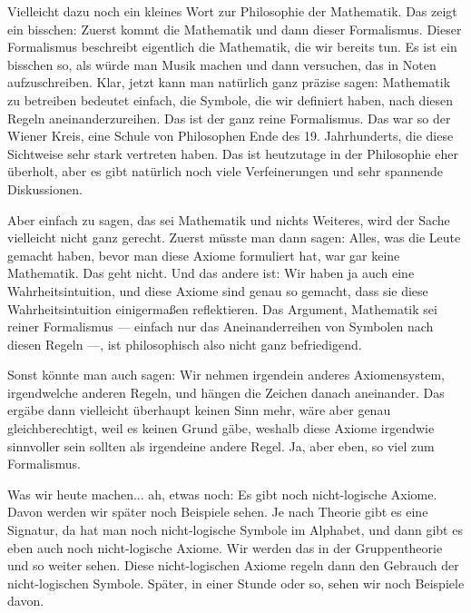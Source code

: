 \begin{spoken-clean}[00:08:40 - 00:10:17]
Vielleicht dazu noch ein kleines Wort zur Philosophie der Mathematik. Das zeigt ein bisschen: Zuerst kommt die Mathematik und dann dieser Formalismus. Dieser Formalismus beschreibt eigentlich die Mathematik, die wir bereits tun. Es ist ein bisschen so, als würde man Musik machen und dann versuchen, das in Noten aufzuschreiben. Klar, jetzt kann man natürlich ganz präzise sagen: Mathematik zu betreiben bedeutet einfach, die Symbole, die wir definiert haben, nach diesen Regeln aneinanderzureihen. Das ist der ganz reine Formalismus. Das war so der Wiener Kreis, eine Schule von Philosophen Ende des 19. Jahrhunderts, die diese Sichtweise sehr stark vertreten haben. Das ist heutzutage in der Philosophie eher überholt, aber es gibt natürlich noch viele Verfeinerungen und sehr spannende Diskussionen.

Aber einfach zu sagen, das sei Mathematik und nichts Weiteres, wird der Sache vielleicht nicht ganz gerecht. Zuerst müsste man dann sagen: Alles, was die Leute gemacht haben, bevor man diese Axiome formuliert hat, war gar keine Mathematik. Das geht nicht. Und das andere ist: Wir haben ja auch eine Wahrheitsintuition, und diese Axiome sind genau so gemacht, dass sie diese Wahrheitsintuition einigermaßen reflektieren. Das Argument, Mathematik sei reiner Formalismus --- einfach nur das Aneinanderreihen von Symbolen nach diesen Regeln ---, ist philosophisch also nicht ganz befriedigend.
\end{spoken-clean}

\begin{spoken-clean}[00:10:17 - 00:11:28]
Sonst könnte man auch sagen: Wir nehmen irgendein anderes Axiomensystem, irgendwelche anderen Regeln, und hängen die Zeichen danach aneinander. Das ergäbe dann vielleicht überhaupt keinen Sinn mehr, wäre aber genau gleichberechtigt, weil es keinen Grund gäbe, weshalb diese Axiome irgendwie sinnvoller sein sollten als irgendeine andere Regel. Ja, aber eben, so viel zum Formalismus.

Was wir heute machen... ah, etwas noch: Es gibt noch nicht-logische Axiome. Davon werden wir später noch Beispiele sehen. Je nach Theorie gibt es eine Signatur, da hat man noch nicht-logische Symbole im Alphabet, und dann gibt es eben auch noch nicht-logische Axiome. Wir werden das in der Gruppentheorie und so weiter sehen. Diese nicht-logischen Axiome regeln dann den Gebrauch der nicht-logischen Symbole. Später, in einer Stunde oder so, sehen wir noch Beispiele davon.
\end{spoken-clean}

